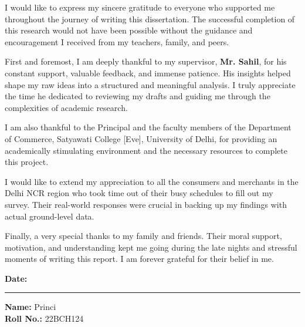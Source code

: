 
I would like to express my sincere gratitude to everyone who supported me throughout the journey of writing this dissertation. The successful completion of this research would not have been possible without the guidance and encouragement I received from my teachers, family, and peers.

First and foremost, I am deeply thankful to my supervisor, \textbf{Mr. Sahil}, for his constant support, valuable feedback, and immense patience. His insights helped shape my raw ideas into a structured and meaningful analysis. I truly appreciate the time he dedicated to reviewing my drafts and guiding me through the complexities of academic research.

I am also thankful to the Principal and the faculty members of the Department of Commerce, Satyawati College [Eve], University of Delhi, for providing an academically stimulating environment and the necessary resources to complete this project.

I would like to extend my appreciation to all the consumers and merchants in the Delhi NCR region who took time out of their busy schedules to fill out my survey. Their real-world responses were crucial in backing up my findings with actual ground-level data.

Finally, a very special thanks to my family and friends. Their moral support, motivation, and understanding kept me going during the late nights and stressful moments of writing this report. I am forever grateful for their belief in me.

\vspace{2cm}

\noindent \textbf{Date:} \rule{4cm}{0.4pt} \hfill \textbf{Name:} Princi \\
\null \hfill \textbf{Roll No.:} 22BCH124
